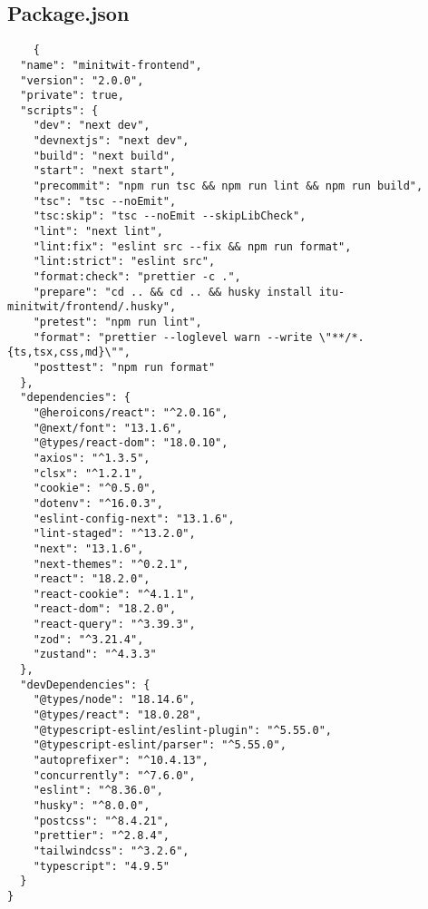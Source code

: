 \subsection{Package.json}\label{subsec:package.json}
\begin{lstlisting}
    {
  "name": "minitwit-frontend",
  "version": "2.0.0",
  "private": true,
  "scripts": {
    "dev": "next dev",
    "devnextjs": "next dev",
    "build": "next build",
    "start": "next start",
    "precommit": "npm run tsc && npm run lint && npm run build",
    "tsc": "tsc --noEmit",
    "tsc:skip": "tsc --noEmit --skipLibCheck",
    "lint": "next lint",
    "lint:fix": "eslint src --fix && npm run format",
    "lint:strict": "eslint src",
    "format:check": "prettier -c .",
    "prepare": "cd .. && cd .. && husky install itu-minitwit/frontend/.husky",
    "pretest": "npm run lint",
    "format": "prettier --loglevel warn --write \"**/*.{ts,tsx,css,md}\"",
    "posttest": "npm run format"
  },
  "dependencies": {
    "@heroicons/react": "^2.0.16",
    "@next/font": "13.1.6",
    "@types/react-dom": "18.0.10",
    "axios": "^1.3.5",
    "clsx": "^1.2.1",
    "cookie": "^0.5.0",
    "dotenv": "^16.0.3",
    "eslint-config-next": "13.1.6",
    "lint-staged": "^13.2.0",
    "next": "13.1.6",
    "next-themes": "^0.2.1",
    "react": "18.2.0",
    "react-cookie": "^4.1.1",
    "react-dom": "18.2.0",
    "react-query": "^3.39.3",
    "zod": "^3.21.4",
    "zustand": "^4.3.3"
  },
  "devDependencies": {
    "@types/node": "18.14.6",
    "@types/react": "18.0.28",
    "@typescript-eslint/eslint-plugin": "^5.55.0",
    "@typescript-eslint/parser": "^5.55.0",
    "autoprefixer": "^10.4.13",
    "concurrently": "^7.6.0",
    "eslint": "^8.36.0",
    "husky": "^8.0.0",
    "postcss": "^8.4.21",
    "prettier": "^2.8.4",
    "tailwindcss": "^3.2.6",
    "typescript": "4.9.5"
  }
}

\end{lstlisting}